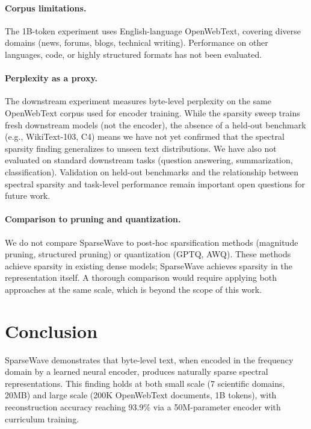 \documentclass[10pt,twocolumn]{article}
\begin{document}
\paragraph{Corpus limitations.} The 1B-token experiment uses English-language OpenWebText, covering diverse domains (news, forums, blogs, technical writing). Performance on other languages, code, or highly structured formats has not been evaluated.

\paragraph{Perplexity as a proxy.} The downstream experiment measures byte-level perplexity on the same OpenWebText corpus used for encoder training. While the sparsity sweep trains fresh downstream models (not the encoder), the absence of a held-out benchmark (e.g., WikiText-103, C4) means we have not yet confirmed that the spectral sparsity finding generalizes to unseen text distributions. We have also not evaluated on standard downstream tasks (question answering, summarization, classification). Validation on held-out benchmarks and the relationship between spectral sparsity and task-level performance remain important open questions for future work.

\paragraph{Comparison to pruning and quantization.} We do not compare SparseWave to post-hoc sparsification methods (magnitude pruning, structured pruning) or quantization (GPTQ, AWQ). These methods achieve sparsity in existing dense models; SparseWave achieves sparsity in the representation itself. A thorough comparison would require applying both approaches at the same scale, which is beyond the scope of this work.

\section{Conclusion}

SparseWave demonstrates that byte-level text, when encoded in the frequency domain by a learned neural encoder, produces naturally sparse spectral representations. This finding holds at both small scale (7 scientific domains, 20MB) and large scale (200K OpenWebText documents, 1B tokens), with reconstruction accuracy reaching 93.9\% via a 50M-parameter encoder with curriculum training.
\end{document}
